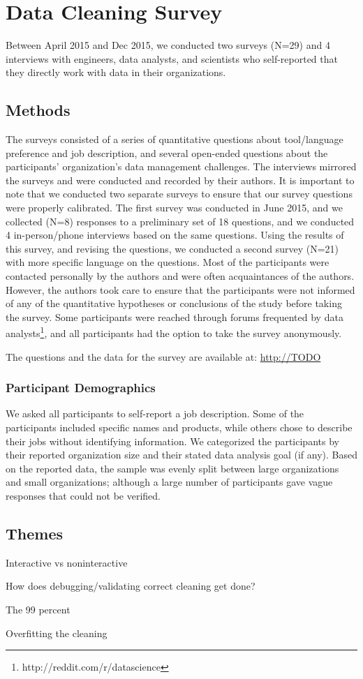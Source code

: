 \section{Data Cleaning Survey}
Between April 2015 and Dec 2015, we conducted two surveys (N=29) and 4 interviews with engineers, data analysts, and scientists who self-reported that they directly work with data in their organizations.

\subsection{Methods}
The surveys consisted of a series of quantitative questions about tool/language preference and job description, and several open-ended questions about the participants' organization's data management challenges. The interviews mirrored the surveys and were conducted and recorded by their authors. 
It is important to note that we conducted two separate surveys to ensure that our survey questions were properly calibrated. The first survey was conducted in June 2015, and we collected (N=8) responses to a preliminary set of 18 questions, and we conducted 4 in-person/phone interviews based on the same questions. Using the results of this survey, and revising the questions, we conducted a second survey (N=21) with more specific language on the questions. 
Most of the participants were contacted personally by the authors and were often acquaintances of the authors. However, the authors took care to ensure that the participants were not informed of any of the quantitative hypotheses or conclusions of the study before taking the survey. 
Some participants were reached through forums frequented by data analysts\footnote{http://reddit.com/r/datascience}, and all participants had the option to take the survey anonymously.

The questions and the data for the survey are available at: \url{http://TODO}

\subsubsection{Participant Demographics}
We asked all participants to self-report a job description. Some of the participants included specific names and products, while others chose to describe their jobs without identifying information. We categorized the participants by their reported organization size and their stated data analysis goal (if any). Based on the reported data, the sample was evenly split between large organizations and small organizations; although a large number of participants gave vague responses that could not be verified.

\subsection{Themes}
Interactive vs noninteractive

How does debugging/validating correct cleaning get done?

The 99 percent

Overfitting the cleaning
